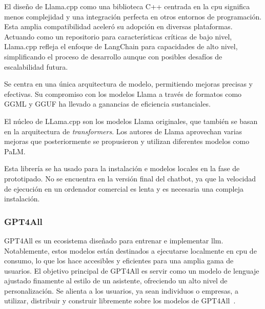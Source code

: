 El diseño de Llama.cpp como una biblioteca C++ centrada en la \acrshort{cpu} significa menos complejidad y una integración perfecta en otros entornos de programación. Esta amplia compatibilidad aceleró su adopción en diversas plataformas. Actuando como un repositorio para características críticas de bajo nivel, Llama.cpp refleja el enfoque de LangChain para capacidades de alto nivel, simplificando el proceso de desarrollo aunque con posibles desafíos de escalabilidad futura.

Se centra en una única arquitectura de modelo, permitiendo mejoras precisas y efectivas. Su compromiso con los modelos Llama a través de formatos como GGML y GGUF ha llevado a ganancias de eficiencia sustanciales.

El núcleo de LLama.cpp son los modelos Llama originales, que también se basan en la arquitectura de \textit{transformers}. Los autores de Llama aprovechan varias mejoras que posteriormente se propusieron y utilizan diferentes modelos como PaLM.

Esta librería se ha usado para la instalación e modelos locales en la fase de prototipado. No se encuentra en la versión final del chatbot, ya que la velocidad de ejecución en un ordenador comercial es lenta y es necesaria una compleja instalación.

\subsubsection{GPT4All}

GPT4All es un ecosistema diseñado para entrenar e implementar \acrlong{llm}. Notablemente, estos modelos están destinados a ejecutarse localmente en \acrshort{cpu} de consumo, lo que los hace accesibles y eficientes para una amplia gama de usuarios. El objetivo principal de GPT4All es servir como un modelo de lenguaje ajustado finamente al estilo de un asistente, ofreciendo un alto nivel de personalización. Se alienta a los usuarios, ya sean individuos o empresas, a utilizar, distribuir y construir libremente sobre los modelos de GPT4All~\cite{gpt4all}.

